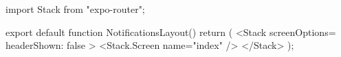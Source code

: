 import { Stack } from "expo-router";

export default function NotificationsLayout() {
  return (
    <Stack screenOptions={{ headerShown: false }}>
      <Stack.Screen name="index" />
    </Stack>
  );
}
